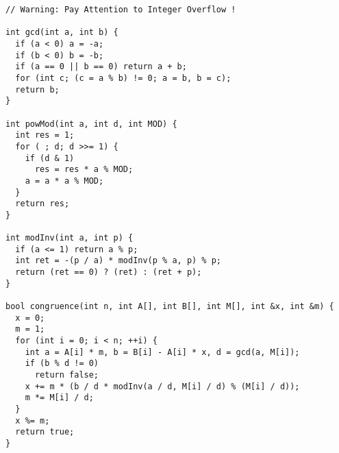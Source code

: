 \begin{lstlisting}
// Warning: Pay Attention to Integer Overflow !

int gcd(int a, int b) {
  if (a < 0) a = -a;
  if (b < 0) b = -b;
  if (a == 0 || b == 0) return a + b;
  for (int c; (c = a % b) != 0; a = b, b = c);
  return b;
}

int powMod(int a, int d, int MOD) {
  int res = 1;
  for ( ; d; d >>= 1) {
    if (d & 1)
      res = res * a % MOD;
    a = a * a % MOD;
  }
  return res;
}

int modInv(int a, int p) {
  if (a <= 1) return a % p;
  int ret = -(p / a) * modInv(p % a, p) % p;
  return (ret == 0) ? (ret) : (ret + p);
}

bool congruence(int n, int A[], int B[], int M[], int &x, int &m) {
  x = 0;
  m = 1;
  for (int i = 0; i < n; ++i) {
    int a = A[i] * m, b = B[i] - A[i] * x, d = gcd(a, M[i]);
    if (b % d != 0)
      return false;
    x += m * (b / d * modInv(a / d, M[i] / d) % (M[i] / d));
    m *= M[i] / d;
  }
  x %= m;
  return true;
}

\end{lstlisting}